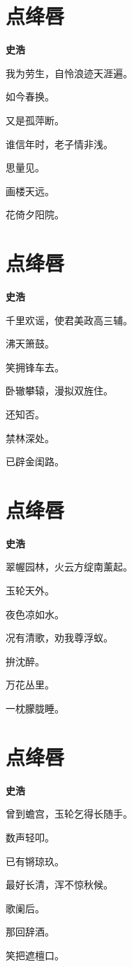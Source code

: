 \documentclass[12pt,a4paper]{ctexbook}
\begin{document}
\section{点绛唇}
\textbf{史浩}\par\vspace{0.5em}
我为劳生，自怜浪迹天涯遍。\par
如今春换。\par
又是孤萍断。\par
谁信年时，老子情非浅。\par
思量见。\par
画楼天远。\par
花倚夕阳院。\par

\section{点绛唇}
\textbf{史浩}\par\vspace{0.5em}
千里欢谣，使君美政高三辅。\par
沸天箫鼓。\par
笑拥锋车去。\par
卧辙攀辕，漫拟双旌住。\par
还知否。\par
禁林深处。\par
已辟金闺路。\par

\section{点绛唇}
\textbf{史浩}\par\vspace{0.5em}
翠幄园林，火云方绽南薰起。\par
玉轮天外。\par
夜色凉如水。\par
况有清歌，劝我尊浮蚁。\par
拚沈醉。\par
万花丛里。\par
一枕朦胧睡。\par

\section{点绛唇}
\textbf{史浩}\par\vspace{0.5em}
曾到蟾宫，玉轮乞得长随手。\par
数声轻叩。\par
已有锵琼玖。\par
最好长清，浑不惊秋候。\par
歌阑后。\par
那回辞酒。\par
笑把遮檀口。\par
\end{document}
